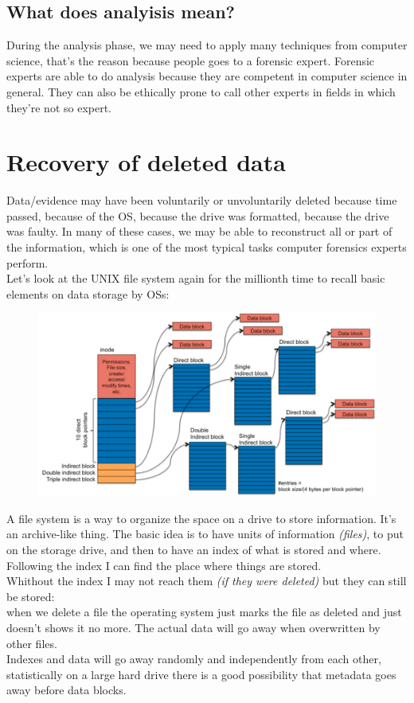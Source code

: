     \subsection{What does analyisis mean?}
        During the analysis phase, we may need to apply many techniques from computer science, that's the reason because people goes to a forensic expert. 
        Forensic experts are able to do analysis because they are competent in computer science in general. They can also be ethically prone to call other experts in fields in which they're not so expert.
    \section{Recovery of deleted data} 
        Data/evidence may have been voluntarily or unvoluntarily deleted because time passed, because of the OS, because the drive was formatted, because the drive was faulty.
        In many of these cases, we may be able to reconstruct all or part of the information, which is one of the most typical tasks computer forensics experts perform.\\
        Let's look at the UNIX file system again for the millionth time to recall basic elements on data storage by OSs:\\
        \begin{figure}[ht!]
            \centering
            \includegraphics[width=0.7\linewidth]{filesystem.png}
        \end{figure}
        A file system is a way to organize the space on a drive to store information. It's an archive-like thing.
        The basic idea is to have units of information \textit{(files)}, to put on the storage drive, and then to have an index of what is stored and where. Following the index I can find the place where things are stored.\\
        Whithout the index I may not reach them \textit{(if they were deleted)} but they can still be stored:\\
        when we delete a file the operating system just marks the file as deleted and just doesn't shows it no more. The actual data will go away when overwritten by other files.\\
        Indexes and data will go away randomly and independently from each other, statistically on a large hard drive there is a good possibility that metadata goes away before data blocks.
